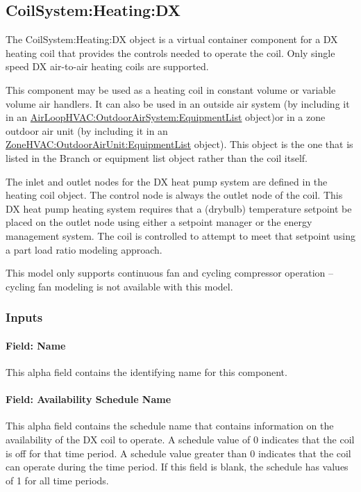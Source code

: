 \subsection{CoilSystem:Heating:DX}\label{coilsystemheatingdx}

The CoilSystem:Heating:DX object is a virtual container component for a DX heating coil that provides the controls needed to operate the coil. Only single speed DX air-to-air heating coils are supported.

This component may be used as a heating coil in constant volume or variable volume air handlers. It can also be used in an outside air system (by including it in an \hyperref[airloophvacoutdoorairsystemequipmentlist]{AirLoopHVAC:OutdoorAirSystem:EquipmentList} object)or in a zone outdoor air unit (by including it in an \hyperref[zonehvacoutdoorairunitequipmentlist]{ZoneHVAC:OutdoorAirUnit:EquipmentList} object). This object is the one that is listed in the Branch or equipment list object rather than the coil itself.

The inlet and outlet nodes for the DX heat pump system are defined in the heating coil object. The control node is always the outlet node of the coil. This DX heat pump heating system requires that a (drybulb) temperature setpoint be placed on the outlet node using either a setpoint manager or the energy management system. The coil is controlled to attempt to meet that setpoint using a part load ratio modeling approach.

This model only supports continuous fan and cycling compressor operation -- cycling fan modeling is not available with this model.

\subsubsection{Inputs}\label{inputs-24}

\paragraph{Field: Name}\label{field-name-23-000}

This alpha field contains the identifying name for this component.

\paragraph{Field: Availability Schedule Name}\label{field-availability-schedule-name-14}

This alpha field contains the schedule name that contains information on the availability of the DX coil to operate. A schedule value of 0 indicates that the coil is off for that time period. A schedule value greater than 0 indicates that the coil can operate during the time period. If this field is blank, the schedule has values of 1 for all time periods.

